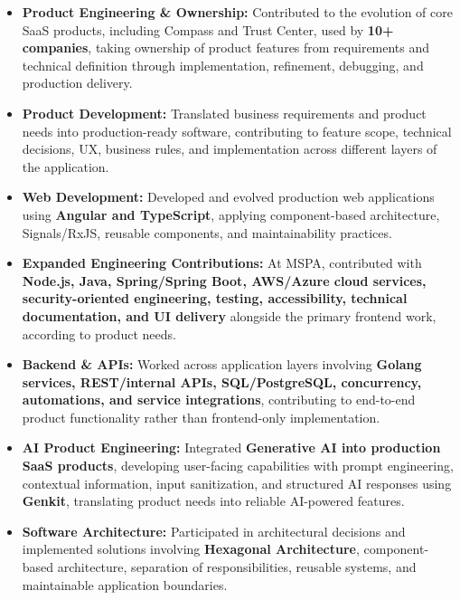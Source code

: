\documentclass[10pt,a4paper]{article}
\begin{document}
\begin{itemize}

    \item
    \textbf{Product Engineering \& Ownership:}
    Contributed to the evolution of core SaaS products, including
    Compass and Trust Center, used by \textbf{10+ companies},
    taking ownership of product features from requirements and
    technical definition through implementation, refinement,
    debugging, and production delivery.

    \item
    \textbf{Product Development:}
    Translated business requirements and product needs into
    production-ready software, contributing to feature scope,
    technical decisions, UX, business rules, and implementation
    across different layers of the application.

    \item
    \textbf{Web Development:}
    Developed and evolved production web applications using
    \textbf{Angular and TypeScript}, applying component-based
    architecture, Signals/RxJS, reusable components, and
    maintainability practices.

    \item
    \textbf{Expanded Engineering Contributions:}
    At MSPA, contributed with \textbf{Node.js, Java, Spring/Spring Boot,
    AWS/Azure cloud services, security-oriented engineering, testing,
    accessibility, technical documentation, and UI delivery} alongside
    the primary frontend work, according to product needs.

    \item
    \textbf{Backend \& APIs:}
    Worked across application layers involving
    \textbf{Golang services, REST/internal APIs, SQL/PostgreSQL,
    concurrency, automations, and service integrations},
    contributing to end-to-end product functionality rather than
    frontend-only implementation.

    \item
    \textbf{AI Product Engineering:}
    Integrated \textbf{Generative AI into production SaaS products},
    developing user-facing capabilities with prompt engineering,
    contextual information, input sanitization, and structured
    AI responses using \textbf{Genkit}, translating product needs
    into reliable AI-powered features.

    \item
    \textbf{Software Architecture:}
    Participated in architectural decisions and implemented
    solutions involving \textbf{Hexagonal Architecture},
    component-based architecture, separation of responsibilities,
    reusable systems, and maintainable application boundaries.


\end{itemize}
\end{document}

